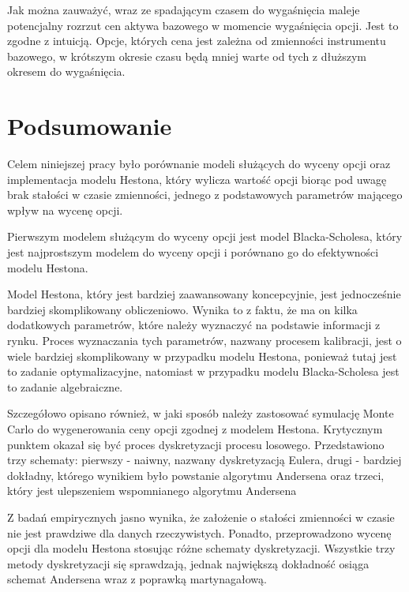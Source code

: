 \documentclass{pracamgr}
\begin{document}
Jak można zauważyć, wraz ze spadającym czasem do wygaśnięcia maleje potencjalny rozrzut cen aktywa 
bazowego w momencie wygaśnięcia opcji.
Jest to zgodne z intuicją. Opcje, których cena jest zależna od zmienności instrumentu bazowego, 
w krótszym okresie czasu będą mniej warte od tych z dłuższym okresem do wygaśnięcia.






\cleardoublepage
{}
\chapter*{Podsumowanie}\label{r:ending}
 

Celem niniejszej pracy było porównanie modeli służących do wyceny
opcji oraz implementacja modelu Hestona, który wylicza wartość opcji biorąc
pod uwagę brak stałości w czasie zmienności, jednego z podstawowych parametrów
mającego wpływ na wycenę opcji. 

Pierwszym modelem służącym do wyceny opcji jest model Blacka-Scholesa, który jest
najprostszym modelem do wyceny opcji i porównano go do efektywności modelu 
Hestona. 

Model Hestona, który jest bardziej zaawansowany koncepcyjnie, jest jednocześnie 
bardziej skomplikowany obliczeniowo. Wynika to z faktu, że ma on kilka dodatkowych
parametrów, które należy wyznaczyć na podstawie informacji z rynku. Proces wyznaczania tych 
parametrów, nazwany procesem kalibracji, jest o wiele bardziej skomplikowany w przypadku 
modelu Hestona, ponieważ tutaj jest to zadanie optymalizacyjne, natomiast w przypadku modelu
Blacka-Scholesa jest to zadanie algebraiczne.

Szczegółowo opisano również, w jaki sposób należy zastosować symulację Monte Carlo do 
wygenerowania ceny opcji zgodnej z modelem Hestona. Krytycznym punktem okazał się być
proces dyskretyzacji procesu losowego. Przedstawiono trzy schematy: pierwszy - naiwny, nazwany
dyskretyzacją Eulera, drugi - bardziej dokładny, którego wynikiem było powstanie 
algorytmu Andersena oraz trzeci, który jest ulepszeniem wspomnianego algorytmu 
Andersena

Z badań empirycznych jasno wynika, że założenie o stałości zmienności w czasie nie jest 
prawdziwe dla danych rzeczywistych. Ponadto, przeprowadzono wycenę opcji 
dla modelu Hestona stosując różne schematy dyskretyzacji.
Wszystkie trzy metody dyskretyzacji się 
sprawdzają, jednak największą dokładność osiąga schemat Andersena wraz
z poprawką martynagałową.
\end{document}
